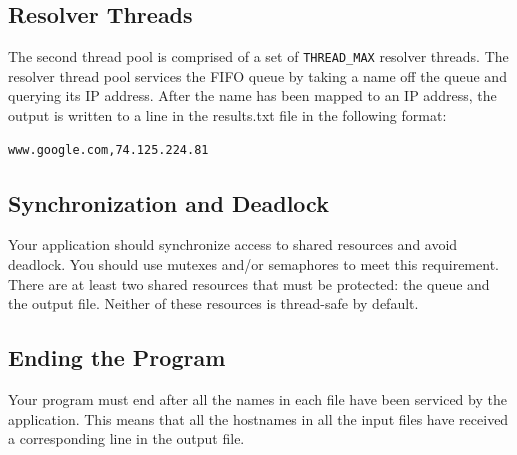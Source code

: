 \documentclass[12pt]{article}
\begin{document}
\subsection{Resolver Threads}
The second thread pool is comprised of a set of \texttt{THREAD\_MAX}
resolver threads. The
resolver thread pool services the FIFO queue by taking a name off the
queue and querying its IP address. After the
name has been mapped to an IP address,
the output is written to a line in the results.txt file in the
following format:

\begin{verbatim}
www.google.com,74.125.224.81
\end{verbatim}

\subsection{Synchronization and Deadlock}
Your application should synchronize access to shared resources and
avoid deadlock. You should use mutexes and/or semaphores to meet this
requirement. There are at least two shared resources that must be
protected: the queue and the output file. Neither of these resources
is thread-safe by default.

\subsection{Ending the Program}
Your program must end after all the names in each file have been
serviced by the application. This means that all the hostnames in all
the input files have received a corresponding line in the output file.
\end{document}
